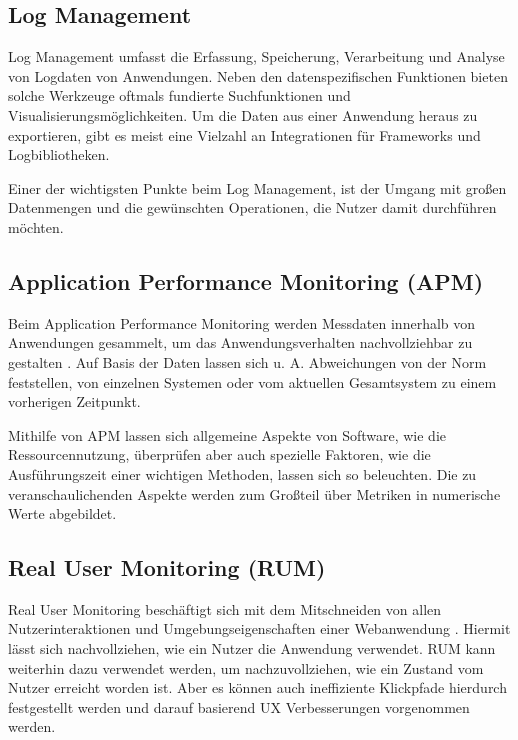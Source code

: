 \subsection{Log Management}

Log Management umfasst die Erfassung, Speicherung, Verarbeitung und Analyse von Logdaten von Anwendungen. Neben den datenspezifischen Funktionen bieten solche Werkzeuge oftmals fundierte Suchfunktionen und Visualisierungsmöglichkeiten. Um die Daten aus einer Anwendung heraus zu exportieren, gibt es meist eine Vielzahl an Integrationen für Frameworks und Logbibliotheken.

Einer der wichtigsten Punkte beim Log Management, ist der Umgang mit großen Datenmengen und die gewünschten Operationen, die Nutzer damit durchführen möchten.

\subsection{Application Performance Monitoring (APM)}

Beim Application Performance Monitoring werden Messdaten innerhalb von Anwendungen gesammelt, um das Anwendungsverhalten nachvollziehbar zu gestalten \cite{StudyingTheEffectivenessOfAPMTools}. Auf Basis der Daten lassen sich u. A. Abweichungen von der Norm feststellen, von einzelnen Systemen oder vom aktuellen Gesamtsystem zu einem vorherigen Zeitpunkt.

Mithilfe von APM lassen sich allgemeine Aspekte von Software, wie die Ressourcennutzung, überprüfen aber auch spezielle Faktoren, wie die Ausführungszeit einer wichtigen Methoden, lassen sich so beleuchten. Die zu veranschaulichenden Aspekte werden zum Großteil über Metriken in numerische Werte abgebildet.

\subsection{Real User Monitoring (RUM)}


Real User Monitoring beschäftigt sich mit dem Mitschneiden von allen Nutzerinteraktionen und Umgebungseigenschaften einer Webanwendung \cite{IdentifyingWebPerformanceDegradations}. Hiermit lässt sich nachvollziehen, wie ein Nutzer die Anwendung verwendet. RUM kann weiterhin dazu verwendet werden, um nachzuvollziehen, wie ein Zustand vom Nutzer erreicht worden ist. Aber es können auch ineffiziente Klickpfade hierdurch festgestellt werden und darauf basierend UX Verbesserungen vorgenommen werden.

